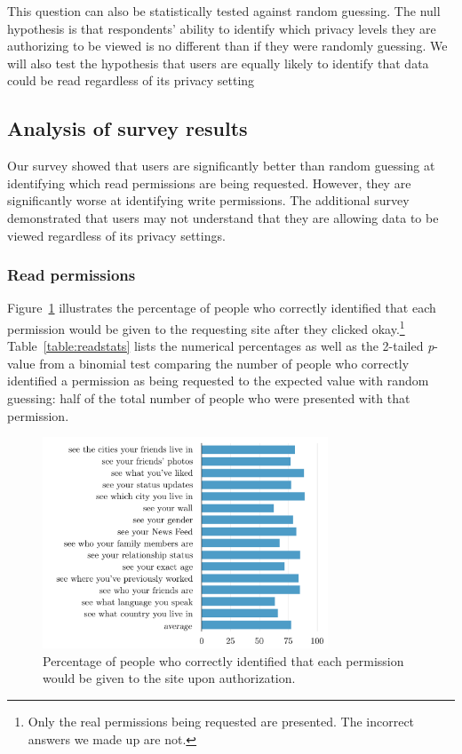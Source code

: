 \documentclass[10pt]{sig-alternate-10pt}
\begin{document}
This question can also be statistically tested against random guessing. The null hypothesis is that respondents' ability to identify which privacy levels they are authorizing to be viewed is no different than if they were randomly guessing. We will also test the hypothesis that users are equally likely to identify that data could be read regardless of its privacy setting

\subsection{Analysis of survey results}

Our survey showed that users are significantly better than random guessing at identifying which read permissions are being requested. However, they are significantly worse at identifying write permissions. The additional survey demonstrated that users may not understand that they are allowing data to be viewed regardless of its privacy settings.

\subsubsection{Read permissions}

Figure~\ref{figure:readpercents} illustrates the percentage of people who correctly identified that each permission would be given to the requesting site after they clicked okay.\footnote{Only the real permissions being requested are presented. The incorrect answers we made up are not.} Table~\ref{table:readstats} lists the numerical percentages as well as the 2-tailed \emph{p}-value from a binomial test comparing the number of people who correctly identified a permission as being requested to the expected value with random guessing: half of the total number of people who were presented with that permission.

\begin{figure}[h!]
  \centering
  \includegraphics[width=8.5cm]{read_percents_cosn}
  \caption{Percentage of people who correctly identified that each permission would be given to the site upon authorization.}
  \label{figure:readpercents}
\end{figure}
\end{document}
